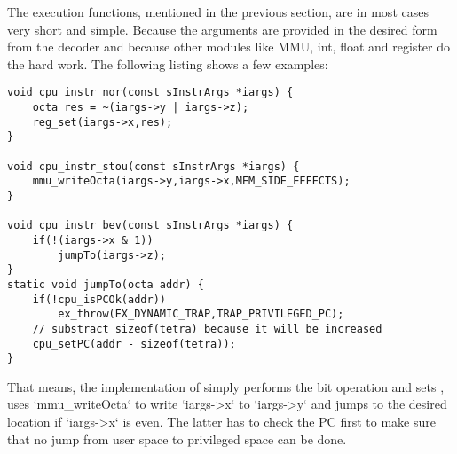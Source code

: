 The execution functions, mentioned in the previous section, are in most cases very short and simple. Because the arguments are provided in the desired form from the decoder and because other modules like MMU, int, float and register do the hard work. The following listing shows a few examples:
\begin{lstlisting}[language={GIMMIXC},caption=Examples of the execution functions]
void cpu_instr_nor(const sInstrArgs *iargs) {
	octa res = ~(iargs->y | iargs->z);
	reg_set(iargs->x,res);
}

void cpu_instr_stou(const sInstrArgs *iargs) {
	mmu_writeOcta(iargs->y,iargs->x,MEM_SIDE_EFFECTS);
}

void cpu_instr_bev(const sInstrArgs *iargs) {
	if(!(iargs->x & 1))
		jumpTo(iargs->z);
}
static void jumpTo(octa addr) {
	if(!cpu_isPCOk(addr))
		ex_throw(EX_DYNAMIC_TRAP,TRAP_PRIVILEGED_PC);
	// substract sizeof(tetra) because it will be increased
	cpu_setPC(addr - sizeof(tetra));
}
\end{lstlisting}
That means, the implementation of  simply performs the bit operation and sets ,  uses `mmu_writeOcta` to write `iargs->x` to `iargs->y` and  jumps to the desired location if `iargs->x` is even. The latter has to check the \gls{PC} first to make sure that no jump from user space to privileged space can be done.

